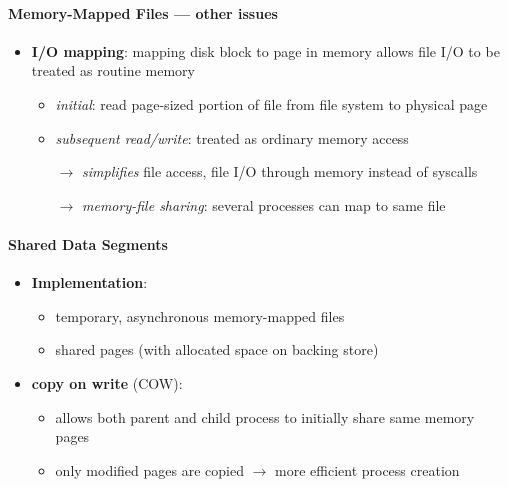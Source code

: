 \paragraph{Memory-Mapped Files --- other issues}
\begin{itemize}
  \item \textbf{I/O mapping}: mapping disk block to page in memory allows file I/O to be treated as routine memory
  \begin{itemize}
    \item \emph{initial}: read page-sized portion of file from file system to physical page
    \item \emph{subsequent read/write}: treated as ordinary memory access
    \item[$ \to $] \emph{simplifies} file access, file I/O through memory instead of syscalls
    \item[$ \to $] \emph{memory-file sharing}: several processes can map to same file
  \end{itemize}
\end{itemize}

\paragraph{Shared Data Segments}
\begin{itemize}
  \item \textbf{Implementation}:
  \begin{itemize}
    \item temporary, asynchronous memory-mapped files
    \item shared pages (with allocated space on backing store)
  \end{itemize}
  \item \textbf{copy on write} (COW):
  \begin{itemize}
    \item allows both parent and child process to initially share same memory pages
    \item only modified pages are copied $ \to $ more efficient process creation
  \end{itemize}
\end{itemize}

